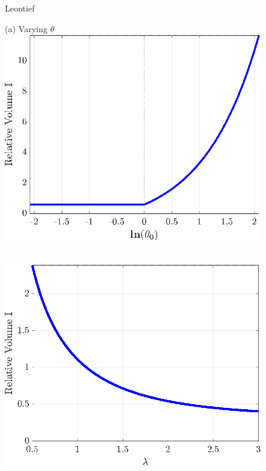\documentclass[12pt,american,english,notitlepage]{article}
\begin{document}
\begin{figure}[H]
\begin{centering}

\centerline{Leontief }
   \begin{minipage}[b]{.49\linewidth}
   \centering
   {(a) Varying $\theta$}  \\[4pt]
   \includegraphics[width=0.8\linewidth]{NewCode/Figures/F_l_vol_theta.eps}
\end{minipage}\hfill   
\begin{minipage}[b]{.49\linewidth}
  \\[4pt]
\includegraphics[width=0.8\linewidth]{NewCode/Figures/F_l_Vol_lambda.eps}
\end{minipage}

\vspace{10pt}

\end{centering}


\end{figure}
\end{document}
